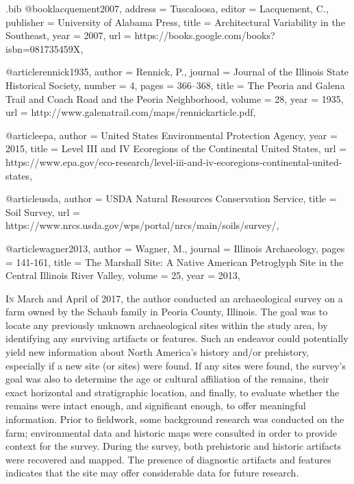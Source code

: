 \begin{filecontents}{\IJSRAidentifier.bib}
	@book{lacquement2007,
		address = {Tuscaloosa},
		editor = {Lacquement, C.},
		publisher = {University of Alabama Press},
		title = {Architectural Variability in the Southeast},
		year = {2007},
		url = {https://books.google.com/books?isbn=081735459X},
	}


	@article{rennick1935,
		author = {Rennick, P.},
		journal = {Journal of the Illinois State Historical Society},
		number = {4},
		pages = {366--368},
		title = {The Peoria and Galena Trail and Coach Road and the Peoria Neighborhood},
		volume = {28},
		year = {1935},
		url = {http://www.galenatrail.com/maps/rennickarticle.pdf},
	}

	@article{epa,
		author = {United States Environmental Protection Agency},
		year = {2015},
		title = {Level III and IV Ecoregions of the Continental United States},
		url = {https://www.epa.gov/eco-research/level-iii-and-iv-ecoregions-continental-united-states},
	}

	@article{usda,
		author = {USDA Natural Resources Conservation Service},
		title = {Soil Survey},
		url = {https://www.nrcs.usda.gov/wps/portal/nrcs/main/soils/survey/},
	}

	@article{wagner2013,
		author = {Wagner, M.},
		journal = {Illinois Archaeology},
		pages = {141-161},
		title = {The Marshall Site: A Native American Petroglyph Site in the Central Illinois River Valley},
		volume = {25},
		year = {2013},
	}
\end{filecontents}

\IJSRAopening
\lettrine{I}{n} March and April of 2017, the author conducted an archaeological survey on a farm owned by the Schaub family in Peoria County, Illinois. The goal was to locate any previously unknown archaeological sites within the study area, by identifying any surviving artifacts or features. Such an endeavor could potentially yield new information about North America’s history and/or prehistory, especially if a new site (or sites) were found. If any sites were found, the survey’s goal was also to determine the age or cultural affiliation of the remains, their exact horizontal and stratigraphic location, and finally, to evaluate whether the remains were intact enough, and significant enough, to offer meaningful information. Prior to fieldwork, some background research was conducted on the farm; environmental data and historic maps were consulted in order to provide context for the survey. During the survey, both prehistoric and historic artifacts were recovered and mapped. The presence of diagnostic artifacts and features indicates that the site may offer considerable data for future research.

